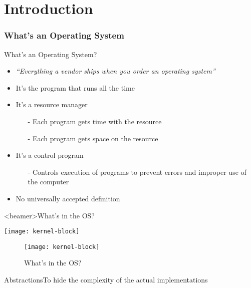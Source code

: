 \mode*
\part{Introduction}


\section{What's an Operating System}

\begin{frame}{What's an Operating System?}
  \begin{itemize}
  \item \emph{``Everything a vendor ships when you order an operating system''}
  \item It's the program that runs all the time
  \item It's a \alert{resource manager}
    \begin{itemize}
    \item[-] Each program gets time with the resource
    \item[-] Each program gets space on the resource
    \end{itemize}
  \item It's a \alert{control program}
    \begin{itemize}
    \item[-] Controls execution of programs to prevent errors and improper use of the
      computer
    \end{itemize}
  \item No universally accepted definition
  \end{itemize}
\end{frame}

\begin{frame}<beamer>{What's in the OS?}
  \begin{center}
    \texttt{[image: kernel-block]}
  \end{center}
\end{frame}

\begin{figure}
  \centering \texttt{[image: kernel-block]}
  \caption{What's in the OS?}
  \label{fig:kernel-block}
\end{figure}

\begin{frame}{Abstractions}{To hide the complexity of the actual implementations}
  \begin{center}
  \end{center}
\end{frame}

